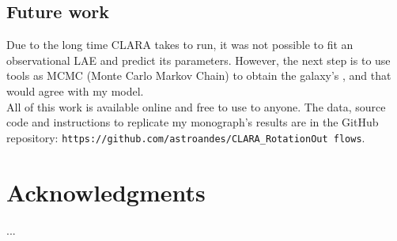 \documentclass[twocolappendix]{latex/emulateapj}
\begin{document}
\subsection{Future work}

Due to the long time CLARA takes to run, it was not possible to fit an observational LAE and predict its parameters. However, the next step is to use tools as MCMC (Monte Carlo Markov Chain) to obtain the galaxy's \tauh, \vrot and \vout that would agree with my model. \\

All of this work is available online and free to use to anyone. The data, source code and instructions to replicate my monograph's results are in the GitHub repository:  \texttt{https://github.com/astroandes/CLARA\_RotationOut flows}. \\


\section*{Acknowledgments}

...\\







\appendix
\end{document}
